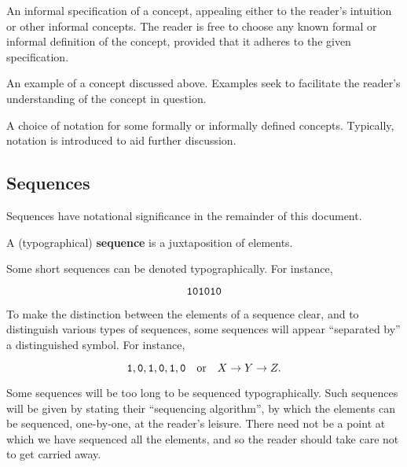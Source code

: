 \begin{specification} An informal specification of a concept, appealing either
to the reader's intuition or other informal concepts. The reader is free to
choose any known formal or informal definition of the concept, provided that it
adheres to the given specification. \end{specification}

\begin{example} An example of a concept discussed above. Examples seek to
facilitate the reader's understanding of the concept in question.
\end{example}

\begin{notation}

A choice of notation for some formally or informally defined concepts.
Typically, notation is introduced to aid further discussion.

\end{notation}

\subsection{Sequences}

Sequences have notational significance in the remainder of this document.

\begin{notion}

A (typographical) \textbf{sequence} is a juxtaposition of elements.

\end{notion}

Some short sequences can be denoted typographically. For instance,

$$\mathtt{1}\mathtt{0}\mathtt{1}\mathtt{0}\mathtt{1}\mathtt{0}$$

To make the distinction between the elements of a sequence clear, and to
distinguish various types of sequences, some sequences will appear ``separated
by'' a distinguished symbol. For instance,

$$\mathtt{1},\mathtt{0},\mathtt{1},\mathtt{0},\mathtt{1},\mathtt{0} \quad \text{or} \quad
X\rightarrow Y \rightarrow Z.$$

Some sequences will be too long to be sequenced typographically. Such sequences
will be given by stating their ``sequencing algorithm'', by which the elements
can be sequenced, one-by-one, at the reader's leisure. There need not be a
point at which we have sequenced all the elements, and so the reader should
take care not to get carried away.

